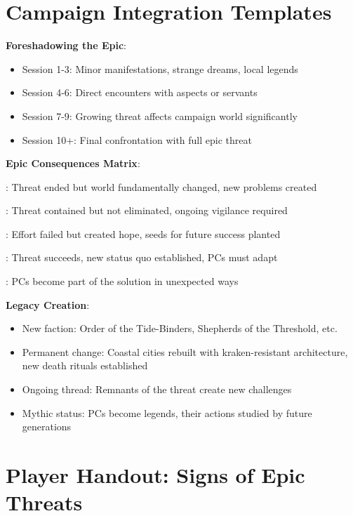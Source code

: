 \documentclass[11pt]{article}
\begin{document}
\section*{Campaign Integration Templates}

\begin{mdframed}[backgroundcolor=epicbg]
\textbf{Foreshadowing the Epic}:
\begin{itemize}[leftmargin=*]
\item Session 1-3: Minor manifestations, strange dreams, local legends
\item Session 4-6: Direct encounters with aspects or servants
\item Session 7-9: Growing threat affects campaign world significantly
\item Session 10+: Final confrontation with full epic threat
\end{itemize}

\textbf{Epic Consequences Matrix}:
\begin{description}[leftmargin=*]
\item[Victory with Great Cost]: Threat ended but world fundamentally changed, new problems created
\item[Compromise Victory]: Threat contained but not eliminated, ongoing vigilance required
\item[Noble Failure]: Effort failed but created hope, seeds for future success planted
\item[Catastrophic Failure]: Threat succeeds, new status quo established, PCs must adapt
\item[Transformation]: PCs become part of the solution in unexpected ways
\end{description}

\textbf{Legacy Creation}:
\begin{itemize}[leftmargin=*]
\item New faction: Order of the Tide-Binders, Shepherds of the Threshold, etc.
\item Permanent change: Coastal cities rebuilt with kraken-resistant architecture, new death rituals established
\item Ongoing thread: Remnants of the threat create new challenges
\item Mythic status: PCs become legends, their actions studied by future generations
\end{itemize}
\end{mdframed}

\section*{Player Handout: Signs of Epic Threats}
\end{document}

